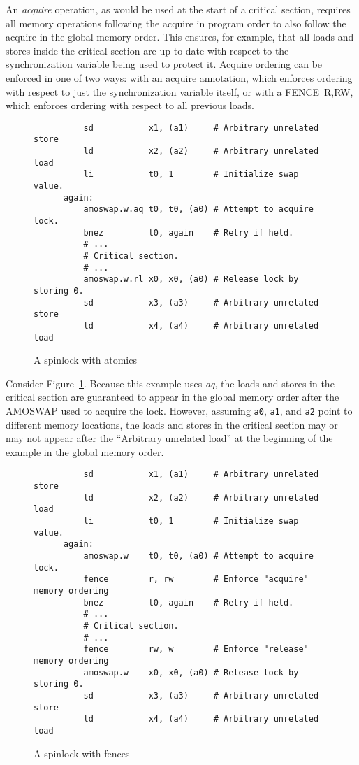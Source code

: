 An {\em acquire} operation, as would be used at the start of a critical section, requires all memory operations following the acquire in program order to also follow the acquire in the global memory order.
This ensures, for example, that all loads and stores inside the critical section are up to date with respect to the synchronization variable being used to protect it.
Acquire ordering can be enforced in one of two ways: with an acquire annotation, which enforces ordering with respect to just the synchronization variable itself, or with a FENCE~R,RW, which enforces ordering with respect to all previous loads.

\begin{figure}[h!]
  \centering\small
  \begin{verbatim}
          sd           x1, (a1)     # Arbitrary unrelated store
          ld           x2, (a2)     # Arbitrary unrelated load
          li           t0, 1        # Initialize swap value.
      again:
          amoswap.w.aq t0, t0, (a0) # Attempt to acquire lock.
          bnez         t0, again    # Retry if held.
          # ...
          # Critical section.
          # ...
          amoswap.w.rl x0, x0, (a0) # Release lock by storing 0.
          sd           x3, (a3)     # Arbitrary unrelated store
          ld           x4, (a4)     # Arbitrary unrelated load
  \end{verbatim}
  \caption{A spinlock with atomics}
  \label{fig:litmus:spinlock_atomics}
\end{figure}

Consider Figure~\ref{fig:litmus:spinlock_atomics}.
Because this example uses {\em aq}, the loads and stores in the critical section are guaranteed to appear in the global memory order after the AMOSWAP used to acquire the lock.  However, assuming {\tt a0}, {\tt a1}, and {\tt a2} point to different memory locations, the loads and stores in the critical section may or may not appear after the ``Arbitrary unrelated load'' at the beginning of the example in the global memory order.

\begin{figure}[h!]
  \centering\small
  \begin{verbatim}
          sd           x1, (a1)     # Arbitrary unrelated store
          ld           x2, (a2)     # Arbitrary unrelated load
          li           t0, 1        # Initialize swap value.
      again:
          amoswap.w    t0, t0, (a0) # Attempt to acquire lock.
          fence        r, rw        # Enforce "acquire" memory ordering
          bnez         t0, again    # Retry if held.
          # ...
          # Critical section.
          # ...
          fence        rw, w        # Enforce "release" memory ordering
          amoswap.w    x0, x0, (a0) # Release lock by storing 0.
          sd           x3, (a3)     # Arbitrary unrelated store
          ld           x4, (a4)     # Arbitrary unrelated load
  \end{verbatim}
  \caption{A spinlock with fences}
  \label{fig:litmus:spinlock_fences}
\end{figure}

